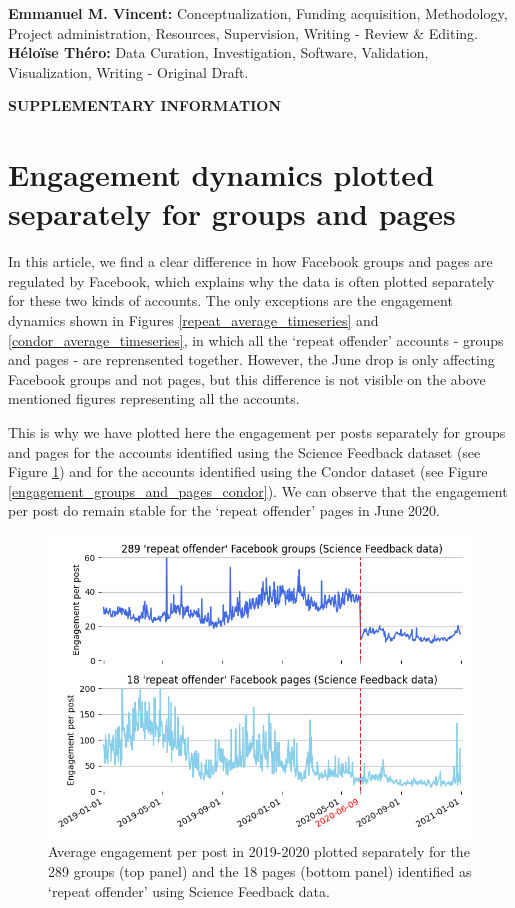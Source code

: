 \documentclass[review]{elsarticle}
\newcommand{\beginsupplement}{%
        \setcounter{table}{0}
        \renewcommand{\thetable}{S\arabic{table}}%
        \setcounter{figure}{0}
        \renewcommand{\thefigure}{S\arabic{figure}}%
     }
\begin{document}
{{\textbf{Emmanuel M. Vincent:} Conceptualization, Funding acquisition, Methodology, Project administration, Resources, Supervision, Writing - Review \& Editing.
\textbf{Héloïse Théro:} Data Curation, Investigation, Software, Validation, Visualization, Writing - Original Draft.



\newpage

\beginsupplement

\textbf{SUPPLEMENTARY INFORMATION}

\section*{Engagement dynamics plotted separately for groups and pages}

In this article, we find a clear difference in how Facebook groups and pages are regulated by Facebook, which explains why the data is often plotted separately for these two kinds of accounts. 
The only exceptions are the engagement dynamics shown in Figures \ref{repeat_average_timeseries} and \ref{condor_average_timeseries}, in which all the `repeat offender' accounts - groups and pages - are reprensented together.
However, the June drop is only affecting Facebook groups and not pages, but this difference is not visible on the above mentioned figures representing all the accounts.

This is why we have plotted here the engagement per posts separately for groups and pages for the accounts identified using the Science Feedback dataset (see Figure \ref{engagement_groups_and_pages_sf}) and for the accounts identified using the Condor dataset (see Figure \ref{engagement_groups_and_pages_condor}). 
We can observe that the engagement per post do remain stable for the `repeat offender' pages in June 2020.

\begin{figure}[!h]
\centering
\includegraphics[scale=0.5]{./../figure/supplementary_engagement_groups_and_pages_sf.png}
\caption{
Average engagement per post in 2019-2020 plotted separately for the 289 groups (top panel) and the 18 pages (bottom panel) identified as `repeat offender' using Science Feedback data.
}
\label{engagement_groups_and_pages_sf}
\end{figure}

}}
\end{document}
